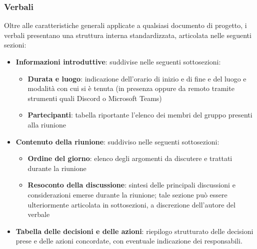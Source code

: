 \documentclass[a4paper, 11pt]{article}
\begin{document}
\subsubsection{Verbali}
Oltre alle caratteristiche generali applicate a qualsiasi documento di progetto, i verbali presentano una struttura interna standardizzata, articolata nelle seguenti sezioni:

\begin{itemize}
    \item \textbf{Informazioni introduttive}: suddivise nelle seguenti sottosezioni:
    \begin{itemize}
        \item \textbf{Durata e luogo}: indicazione dell'orario di inizio e di fine e del luogo e modalità con cui si è tenuta (in presenza oppure da remoto tramite strumenti quali Discord o Microsoft Teams)
        \item \textbf{Partecipanti}: tabella riportante l'elenco dei membri del gruppo presenti alla riunione
    \end{itemize}
    \item \textbf{Contenuto della riunione}: suddiviso nelle seguenti sottosezioni:
    \begin{itemize}
        \item \textbf{Ordine del giorno}: elenco degli argomenti da discutere e trattati durante la riunione
        \item \textbf{Resoconto della discussione}: sintesi delle principali discussioni e considerazioni emerse durante la riunione; tale sezione può essere ulteriormente articolata in sottosezioni, a discrezione dell'autore del verbale
    \end{itemize}
    \item \textbf{Tabella delle decisioni e delle azioni}: riepilogo strutturato delle decisioni prese e delle azioni concordate, con eventuale indicazione dei responsabili.
\end{itemize}
\end{document}
